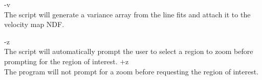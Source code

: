 \documentclass[twoside,11pt]{article}
\begin{document}
{{{         \sstitem
         -v\\
           The script will generate a variance array from the line fits and
           attach it to the velocity map NDF.

         \sstitem
         -z\\
           The script will automatically prompt the user to select a region to
           zoom before prompting for the region of interest.
         $+$z\\
           The program will not prompt for a zoom before requesting the region
           of interest.
      }
   }
}
\end{document}
